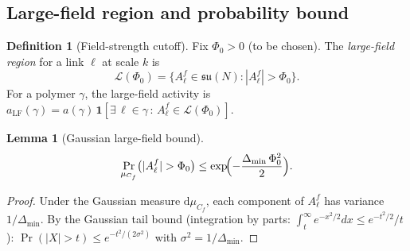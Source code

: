 \documentclass[11pt,a4paper]{amsart}
\newtheorem{lemma}[theorem]{Lemma}
\theoremstyle{definition}
\newtheorem{definition}[theorem]{Definition}
\newcommand{\su}{\mathfrak{su}}
\newcommand{\Del}{\Delta_{\min}}
\newcommand{\Cf}{C_f}
\begin{document}
\subsection{Large-field region and probability bound}

\begin{definition}[Field-strength cutoff]
Fix $\Phi_0 > 0$ (to be chosen).
The \emph{large-field region} for a link $\ell$ at scale $k$ is
\[
  \mathcal{L}(\Phi_0) = \{A^f_\ell \in \su(N) : |A^f_\ell| > \Phi_0\}.
\]
For a polymer $\gamma$, the large-field activity is
$a_{\mathrm{LF}}(\gamma) = a(\gamma)\,\mathbf{1}[\exists\,\ell\in\gamma\,:\,
A^f_\ell\in\mathcal{L}(\Phi_0)]$.
\end{definition}

\begin{lemma}[Gaussian large-field bound]
\label{lem:LF_gauss}
\[
  \Pr_{\mu_{\Cf}}\bigl(|A^f_\ell| > \Phi_0\bigr)
  \le \exp\!\Bigl(-\frac{\Del\,\Phi_0^2}{2}\Bigr).
\]
\end{lemma}
\begin{proof}
Under the Gaussian measure $\mathrm{d}\mu_{\Cf}$, each component of $A^f_\ell$
has variance $1/\Del$.
By the Gaussian tail bound (integration by parts: $\int_t^\infty e^{-x^2/2}dx
\le e^{-t^2/2}/t$):
$\Pr(|X|>t) \le e^{-t^2/(2\sigma^2)}$ with $\sigma^2 = 1/\Del$.
\end{proof}
\end{document}

